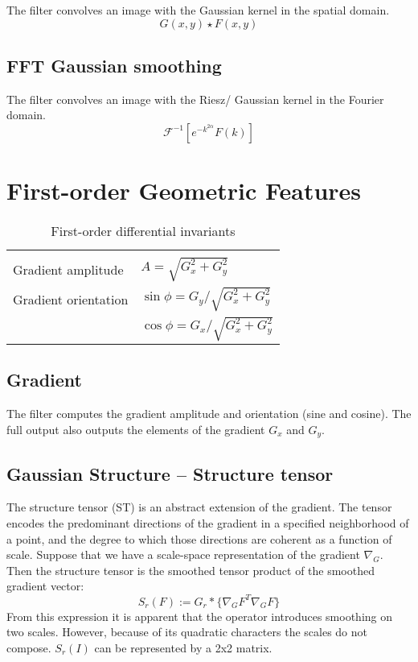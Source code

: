 \documentclass{amsart}
\begin{document}
The filter convolves an image with the Gaussian kernel in the spatial domain.
\[
G (x,y) \star F (x,y)
\]

\subsection{FFT Gaussian smoothing}\label{sec:fftgauss}

The filter convolves an image with the Riesz/ Gaussian kernel in the Fourier domain.
  \[
   \mathcal{F}^{-1}\left[  e^{-k^{2 \alpha}} F(k)\right] 
  \]
\section{First-order Geometric Features}\label{sec:1order}

\begin{table}[h!]
	\centering
	\begin{tabular}{ll}
		\hline
		\\
		Gradient amplitude & $ A= \sqrt{G_x^2+ G_y^2} $\\
		Gradient orientation & $ \sin{\phi}= G_y / \sqrt{G_x^2+ G_y^2} $\\
		& $ \cos{\phi}= G_x / \sqrt{G_x^2+ G_y^2} $\\
		\hline
	\end{tabular} 
	\caption{First-order differential invariants}\label{tab:grad} 
\end{table}
\subsection{Gradient }\label{sec:gradient}
The  filter computes the gradient  amplitude and orientation (sine and cosine).
The full output also outputs the elements of the gradient $G_x$ and $G_y$.


\subsection{Gaussian Structure -- Structure tensor}\label{sec:struct}

The structure tensor (ST) is an abstract extension of the gradient.  
The tensor encodes the predominant directions of the gradient in a specified neighborhood of a point, and the degree to which those directions 
are coherent as a function of scale.
Suppose that we have a scale-space representation of the gradient  $\nabla_G $.
Then the structure tensor is the smoothed tensor product of the smoothed gradient vector\cite{Brox2004}:
\[
S_r (F) := G_r \ast \{ \nabla_G F^T  \nabla_G F    \}
\]
From this expression it is apparent that the operator introduces smoothing on two scales.
However, because of its quadratic characters the scales do not compose.
$S_r (I)$ can be represented by a 2x2 matrix. %
\end{document}
